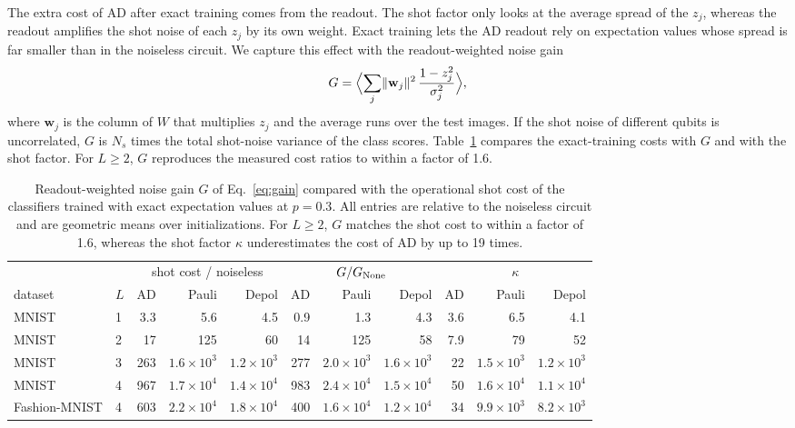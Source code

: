 \documentclass[
 aps,pra,
 twocolumn,
 superscriptaddress,
 longbibliography,
 nofootinbib
]{revtex4-2}
\begin{document}
The extra cost of AD after exact training comes from the readout. The shot
factor only looks at the average spread of the $z_j$, whereas the readout
amplifies the shot noise of each $z_j$ by its own weight. Exact training lets
the AD readout rely on expectation values whose spread is far smaller than in
the noiseless circuit. We capture this effect with the readout-weighted noise
gain
\begin{equation}
G=\Bigl\langle\sum_j\lVert\mathbf w_j\rVert^2\,\frac{1-z_j^2}{\sigma_j^2}\Bigr\rangle ,
\label{eq:gain}
\end{equation}
where $\mathbf w_j$ is the column of $W$ that multiplies $z_j$ and the average
runs over the test images. If the shot noise of different qubits is
uncorrelated, $G$ is $N_s$ times the total shot-noise variance of the class
scores. Table~\ref{tab:gain} compares the exact-training costs with $G$ and
with the shot factor. For $L\ge2$, $G$ reproduces the measured cost ratios to
within a factor of 1.6.

\begin{table}[t]
\caption{Readout-weighted noise gain $G$ of Eq.~\eqref{eq:gain} compared with the
operational shot cost of the classifiers trained with exact expectation values at
$p=0.3$. All entries are relative to the noiseless circuit and are geometric means
over initializations. For $L\ge2$, $G$ matches the shot cost to within a factor of
1.6, whereas the shot factor $\kappa$ underestimates the cost of AD by up to 19 times.}
\label{tab:gain}
\begin{ruledtabular}
\begin{tabular}{llrrrrrrrrr}
 & & \multicolumn{3}{c}{shot cost / noiseless} & \multicolumn{3}{c}{$G/G_{\rm None}$} & \multicolumn{3}{c}{$\kappa$}\\
dataset & $L$ & AD & Pauli & Depol & AD & Pauli & Depol & AD & Pauli & Depol\\
\colrule
MNIST & 1 & 3.3 & 5.6 & 4.5 & 0.9 & 1.3 & 4.3 & 3.6 & 6.5 & 4.1\\
MNIST & 2 & 17 & 125 & 60 & 14 & 125 & 58 & 7.9 & 79 & 52\\
MNIST & 3 & 263 & $1.6\times10^3$ & $1.2\times10^3$ & 277 & $2.0\times10^3$ & $1.6\times10^3$ & 22 & $1.5\times10^3$ & $1.2\times10^3$\\
MNIST & 4 & 967 & $1.7\times10^4$ & $1.4\times10^4$ & 983 & $2.4\times10^4$ & $1.5\times10^4$ & 50 & $1.6\times10^4$ & $1.1\times10^4$\\
Fashion-MNIST & 4 & 603 & $2.2\times10^4$ & $1.8\times10^4$ & 400 & $1.6\times10^4$ & $1.2\times10^4$ & 34 & $9.9\times10^3$ & $8.2\times10^3$\\
\end{tabular}
\end{ruledtabular}
\end{table}
\end{document}
